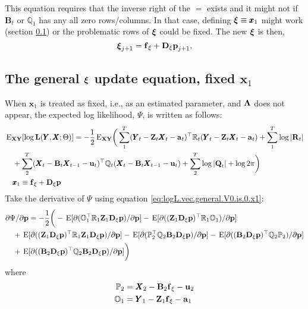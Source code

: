 \documentclass[]{article}
\def\xixi{\mbox{\boldmath $\xi$}}
\def\LAM{\mbox{\boldmath $\Lambda$}}
\def\UPS{\mbox{\boldmath $\Upsilon$}}
\def\XI{\mbox{\boldmath $\Xi$}}
\def\BB{\mbox{$\mathbf B$}}	\def\bb{\mbox{$\mathbf b$}} \def\Bb{\mbox{$\mathbf J$}} \def\Ba{\mbox{$\mathbf L$}} \def\Bm{\UPS}
\def\DD{\mbox{$\mathbf D$}}	\def\dd{\mbox{$\mathbf d$}}
\def\E{\,\textup{\textrm{E}}}
\def\EXy{\,\textup{\textrm{E}}_{\text{{\bf XY}}}}
\def\LL{\mbox{$\mathbf L$}}	\def\ll{\mbox{$\mathbf l$}}
\def\QQ{\mbox{$\mathbf Q$}}	 \def\qq{\mbox{$\mathbf q$}} \def\Qb{\mbox{$\mathbf G$}}  \def\Qm{\mathbb{Q}}
\def\RR{\mbox{$\mathbf R$}}	 \def\rr{\mbox{$\mathbf r$}} \def\Rb{\mbox{$\mathbf H$}}	\def\Rm{\mathbb{R}}
\def\XX{\mbox{$\pmb{X}$}}	\def\xx{\mbox{$\pmb{x}$}}
\def\YY{\mbox{$\pmb{Y}$}}	\def\yy{\mbox{$\pmb{y}$}}
\def\ZZ{\mbox{$\mathbf Z$}}	\def\zz{\mbox{$\mathbf z$}}	\def\Zb{\mbox{$\mathbf M$}} \def\Za{\mbox{$\mathbf N$}} \def\Zm{\XI}
\begin{document}
This equation requires that the inverse right of the $=$ exists and it might not if $\BB_t$ or $\Qm_1$ has any all zero rows/columns.  In that case, defining $\xixi \equiv \xx_1$ might work (section \ref{sec:general.x1.update}) or the problematic rows of $\xixi$ could be fixed.
The new $\xixi$ is then,
\begin{equation}
\xixi_{j+1} = \ff_\xi + \DD_\xi\pp_{j+1},
\end{equation}

\subsection{The general $\xixi$ update equation, fixed $\xx_1$}\label{sec:general.x1.update}
When $\xx_1$ is treated as fixed, i.e., as an estimated parameter, and $\LAM$ does not appear, the expected log likelihood, $\Psi$, is written as follows:
\begin{equation}\label{eq:logL.vec.general.V0.is.0.x1}
\begin{split}
&\EXy[\log\LL(\YY,\XX ; \Theta)] = -\frac{1}{2}\EXy\bigg(
 \sum_1^T(\YY_t - \ZZ_t\XX_t - \aa_t)^\top \Rm_t (\YY_t - \ZZ_t\XX_t - \aa_t) +\sum_1^T \log |\RR_t|\\
&\quad +\sum_2^T(\XX_t - \BB_t\XX_{t-1} - \uu_t)^\top \Qm_t (\XX_t - \BB_t\XX_{t-1} - \uu_t)
 +\sum_2^T\log |\QQ_t| + \log 2\pi\bigg)\\
&\quad \xx_1 \equiv \ff_\xi+\DD_\xi\pp  
\end{split}
\end{equation}
Take the derivative of $\Psi$ using equation \ref{eq:logL.vec.general.V0.is.0.x1}:
\begin{equation}
\begin{split}
&\partial\Psi/\partial\pp = -\frac{1}{2} \bigg(
-\E[\partial(\mathbb{O}_1^\top\Rm_1\ZZ_1\DD_\xi\pp)/\partial\pp]  -\E[\partial((\ZZ_1\DD_\xi\pp)^\top\Rm_1\mathbb{O}_1)/\partial\pp] \\
&\quad +\E[\partial((\ZZ_1\DD_\xi\pp)^\top\Rm_1\ZZ_1\DD_\xi\pp)/\partial\pp]
 -\E[\partial(\mathbb{P}_2^\top\Qm_2\BB_2\DD_\xi\pp)/\partial\pp]  -\E[\partial((\BB_2\DD_\xi\pp)^\top\Qm_2\mathbb{P}_2)/\partial\pp] \\
&\quad +\E[\partial((\BB_2\DD_\xi\pp)^\top\Qm_2\BB_2\DD_\xi\pp)/\partial\pp]  
\bigg)
\end{split}
\end{equation}
where
\begin{equation}
\begin{split}
\mathbb{P}_2&=\XX_2 - \BB_2\ff_\xi  - \uu_2\\
\mathbb{O}_1&=\YY_1 - \ZZ_1\ff_\xi  - \aa_1\\
\end{split}
\end{equation}
 
\end{document}
